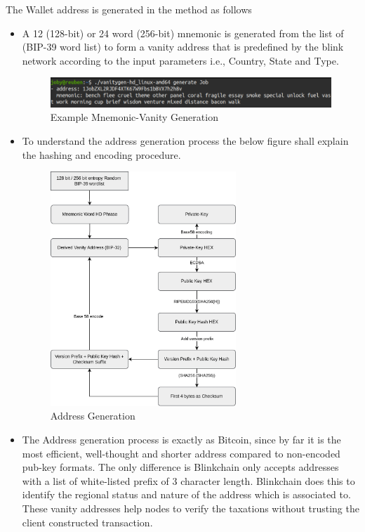 \documentclass[letterpaper,11pt]{article}
\begin{document}
The Wallet address is generated in the method as follows
\begin{itemize}[wide, labelwidth=!, labelindent=0pt]
\item A 12 (128-bit) or 24 word (256-bit) mnemonic is generated from the list of (BIP-39 word list) to form a vanity address that is predefined by the blink network according to the input parameters i.e., Country, State and Type.

\begin{figure}[H]
\begin{center}
\includegraphics[width=\textwidth]{vanity-terminal}
\caption{Example Mnemonic-Vanity Generation}
\end{center}
\end{figure}

\item To understand the address generation process the below figure shall explain the hashing and encoding procedure.

\begin{figure}[H]
\begin{center}
\includegraphics[width=7cm]{encodebip39}
\caption{Address Generation}
\end{center}
\end{figure}

\item The Address generation process is exactly as Bitcoin, since by far it is the most efficient, well-thought and shorter address compared to non-encoded pub-key formats. The only difference is Blinkchain only accepts addresses with a list of white-listed prefix of 3 character length. Blinkchain does this to identify the regional status and nature of the address which is associated to. These vanity addresses help nodes to verify the taxations without trusting the client constructed transaction.


\end{itemize}
\end{document}
